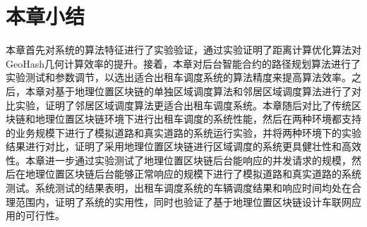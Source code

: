 \section{本章小结}
本章首先对系统的算法特征进行了实验验证，通过实验证明了距离计算优化算法对GeoHash几何计算效率的提升。接着，本章对后台智能合约的路径规划算法进行了实验测试和参数调节，以选出适合出租车调度系统的算法精度来提高算法效率。之后，本章对基于地理位置区块链的单独区域调度算法和邻居区域调度算法进行了对比实验，证明了邻居区域调度算法更适合出租车调度系统。本章随后对比了传统区块链和地理位置区块链环境下进行出租车调度的系统性能，然后在两种环境都支持的业务规模下进行了模拟道路和真实道路的系统运行实验，并将两种环境下的实验结果进行对比，证明了采用地理位置区块链进行区域调度的系统更具健壮性和高效性。本章进一步通过实验测试了地理位置区块链后台能响应的并发请求的规模，然后在地理位置区块链后台能够正常响应的规模下进行了模拟道路和真实道路的系统测试。系统测试的结果表明，出租车调度系统的车辆调度结果和响应时间均处在合理范围内，证明了系统的实用性，同时也验证了基于地理位置区块链设计车联网应用的可行性。
